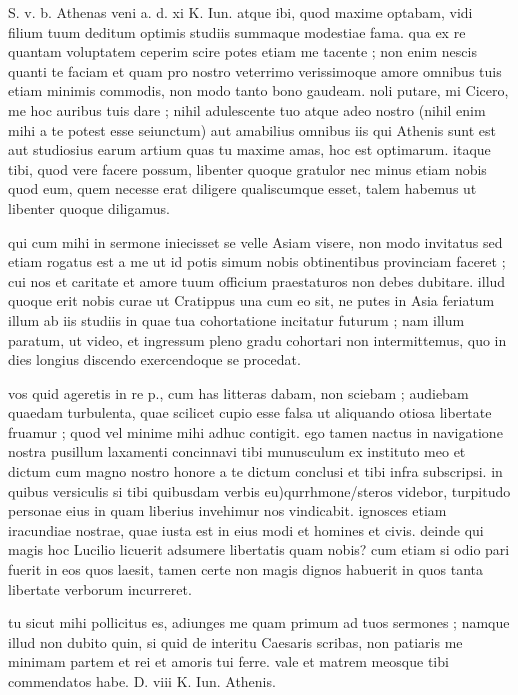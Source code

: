 


 S. v. b. Athenas veni a. d. xi K. Iun. atque ibi, quod maxime optabam, vidi filium tuum deditum optimis studiis summaque modestiae fama. qua ex re quantam voluptatem ceperim scire potes etiam me tacente ; non enim nescis quanti te faciam et quam pro nostro veterrimo verissimoque amore omnibus tuis etiam minimis commodis, non modo tanto bono gaudeam. noli putare, mi Cicero, me hoc auribus tuis dare ; nihil adulescente tuo atque adeo nostro (nihil enim mihi a te potest esse seiunctum) aut amabilius omnibus iis qui Athenis sunt est aut studiosius earum artium quas tu maxime amas, hoc est optimarum. itaque tibi, quod vere facere possum, libenter quoque gratulor nec minus etiam nobis quod eum, quem necesse erat diligere qualiscumque esset, talem habemus ut libenter quoque diligamus.

 qui cum mihi in sermone iniecisset se velle Asiam visere, non modo invitatus sed etiam rogatus est a me ut id potis simum nobis obtinentibus provinciam faceret ; cui nos et caritate et amore tuum officium praestaturos non debes dubitare. illud quoque erit nobis curae ut Cratippus una cum eo sit, ne putes in Asia feriatum illum ab iis studiis in quae tua cohortatione incitatur futurum ; nam illum paratum, ut video, et ingressum pleno gradu cohortari non intermittemus, quo in dies longius discendo exercendoque se procedat.

 vos quid ageretis in re p., cum has litteras dabam, non sciebam ; audiebam quaedam turbulenta, quae scilicet cupio esse falsa ut aliquando otiosa libertate fruamur ; quod vel minime mihi adhuc contigit. ego tamen nactus in navigatione nostra pusillum laxamenti concinnavi tibi munusculum ex instituto meo et dictum cum magno nostro honore a te dictum conclusi et tibi infra subscripsi. in quibus versiculis si tibi quibusdam verbis eu)qurrhmone/steros videbor, turpitudo personae eius in quam liberius invehimur nos vindicabit. ignosces etiam iracundiae nostrae, quae iusta est in eius modi et homines et civis. deinde qui magis hoc Lucilio licuerit adsumere libertatis quam nobis? cum etiam si odio pari fuerit in eos quos laesit, tamen certe non magis dignos habuerit in quos tanta libertate verborum incurreret.

 tu sicut mihi pollicitus es, adiunges me quam primum ad tuos sermones ; namque illud non dubito quin, si quid de interitu Caesaris scribas, non patiaris me minimam partem et rei et amoris tui ferre. vale et matrem meosque tibi commendatos habe. D. viii K. Iun. Athenis.
